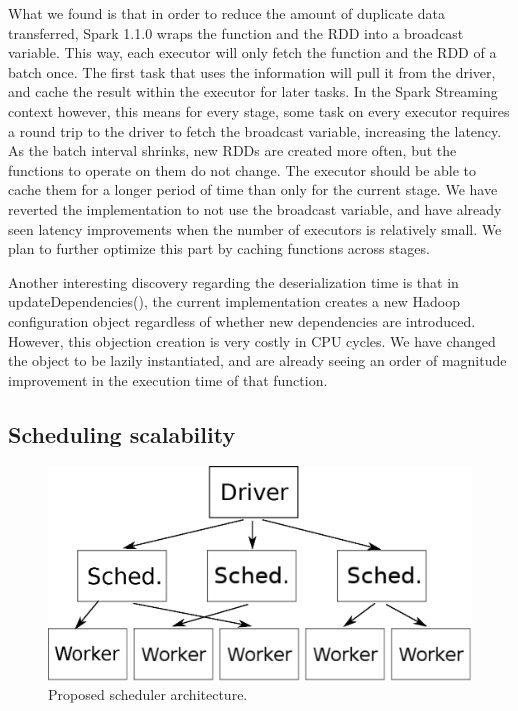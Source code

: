 What we found is that in order to reduce the amount of duplicate data transferred, Spark 1.1.0 wraps the function and the RDD into a broadcast variable. This way, each executor will only fetch the function and the RDD of a batch once. The first task that uses the information will pull it from the driver, and cache the result within the executor for later tasks. In the Spark Streaming context however, this means for every stage, some task on every executor requires a round trip to the driver to fetch the broadcast variable, increasing the latency. As the batch interval shrinks, new RDDs are created more often, but the functions to operate on them do not change. The executor should be able to cache them for a longer period of time than only for the current stage. We have reverted the implementation to not use the broadcast variable, and have already seen latency improvements when the number of executors is relatively small. We plan to further optimize this part by caching functions across stages.

Another interesting discovery regarding the deserialization time is that in updateDependencies(), the current implementation creates a new Hadoop configuration object regardless of whether new dependencies are introduced. However, this objection creation is very costly in CPU cycles. We have changed the object to be lazily instantiated, and are already seeing an order of magnitude improvement in the execution time of that function.


\subsection{Scheduling scalability}

\begin{figure}[h!]
  \begin{center}
    \includegraphics[scale=0.45]{scheduler_architecture.eps}
  \end{center}
  \caption{Proposed scheduler architecture.}
  \label{fig:schedarch}
\end{figure}

